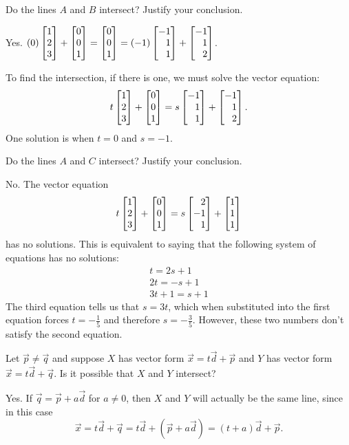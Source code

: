 	\begin{parts}
		\item Do the lines $A$ and $B$ intersect? Justify your conclusion.
			\begin{solution}
				Yes. $(0)\mat{1\\2\\3}+\mat{0\\0\\1} = \mat{0\\0\\1} = (-1)\mat{-1\\1\\1}+\mat{-1\\1\\2}$.

				To find the intersection, if there is one, we must solve the vector equation:
				\[
					t\mat{1\\2\\3}+\mat{0\\0\\1} = s\mat{-1\\1\\1}+\mat{-1\\1\\2}.
				\]
				One solution is when $t = 0$ and $s = -1$.
			\end{solution}
		\item Do the lines $A$ and $C$ intersect? Justify your conclusion.
			\begin{solution}
				No. The vector equation
				\[
					t\mat{1\\2\\3}+\mat{0\\0\\1} = s\mat{2\\-1\\1}+\mat{1\\1\\1}
				\]
				has no solutions. This is equivalent to saying that the following
				system of equations has no solutions:
				\begin{gather*}
					t = 2s + 1 \\
					2t = -s + 1 \\
					3t + 1 = s + 1
				\end{gather*}
				The third equation tells us that $s = 3t$, which when substituted
				into the first equation forces $t = -\tfrac{1}{5}$ and therefore
				$s = -\tfrac{3}{5}$. However, these two numbers don't satisfy the second
				equation.
			\end{solution}
		\item Let $\vec p\neq \vec q$ and suppose
			$X$ has vector form $\vec x=t\vec d+\vec p$ and $Y$ has
			vector form $\vec x=t\vec d+\vec q$. Is it possible
			that $X$ and $Y$ intersect?
			\begin{solution}
				Yes. If $\vec q=\vec p+a\vec d$ for $a\neq 0$, then $X$ and $Y$
				will actually be the same line, since in this case
				\[
					\vec x = t\vec d+\vec q
					= t\vec d+(\vec p+a\vec d)
					= (t+a)\vec d+\vec p.
				\]


\end{solution}
\end{parts}
